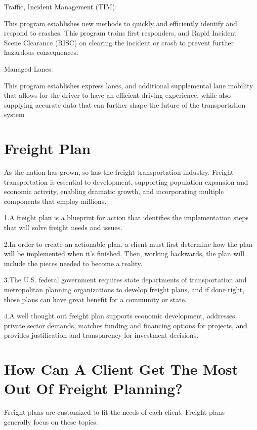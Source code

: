 \documentclass[
]{book}
\begin{document}
Traffic, Incident Management (TIM):

This program establishes new methods to quickly and efficiently identify and respond to crashes. This program trains first responders, and Rapid Incident Scene Clearance (RISC) on clearing the incident or crash to prevent further hazardous consequences.

Managed Lanes:

This program establishes express lanes, and additional supplemental lane mobility that allows for the driver to have an efficient driving experience, while also supplying accurate data that can further shape the future of the transportation system

\hypertarget{planning-freight}{%
\section{Freight Plan}\label{planning-freight}}

As the nation has grown, so has the freight transportation industry. Freight transportation is essential to development, supporting population expansion and economic activity, enabling dramatic growth, and incorporating multiple components that employ millions.

1.A freight plan is a blueprint for action that identifies the implementation steps that will solve freight needs and issues.

2.In order to create an actionable plan, a client must first determine how the plan will be implemented when it's finished. Then, working backwards, the plan will include the pieces needed to become a reality.

3.The U.S. federal government requires state departments of transportation and metropolitan planning organizations to develop freight plans, and if done right, those plans can have great benefit for a community or state.

4.A well thought out freight plan supports economic development, addresses private sector demands, matches funding and financing options for projects, and provides justification and transparency for investment decisions.

\hypertarget{planning-freightplanning}{%
\section{How Can A Client Get The Most Out Of Freight Planning?}\label{planning-freightplanning}}

Freight plans are customized to fit the needs of each client.
Freight plans generally focus on these topics:
\end{document}
